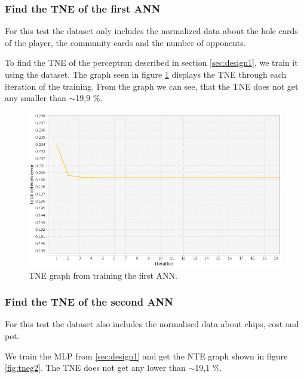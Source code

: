 \subsubsection{Find the TNE of the first ANN}
\label{sec:ann-test1}
For this test the dataset only includes the normalized data about the hole cards of the player, the community cards and the number of opponents.

To find the TNE of the perceptron described in section \ref{sec:design1}, we train it using the dataset. The graph seen in figure \ref{fig:tneg1} displays the TNE through each iteration of the training. From the graph we can see, that the TNE does not get any smaller than $\sim$19,9 \%.

\begin{figure}[H]
  \center
    \includegraphics[scale=0.6]{images/nn/default-nn1-err.png}
  \caption{TNE graph from training the first ANN.\label{fig:tneg1}}
\end{figure}

\subsubsection{Find the TNE of the second ANN}
\label{sec:ann-test2}
For this test the dataset also includes the normalised data about chips, cost and pot.

We train the MLP from \ref{sec:design1} and get the NTE graph shown in figure \ref{fig:tneg2}. The TNE does not get any lower than $\sim$19,1 \%.

